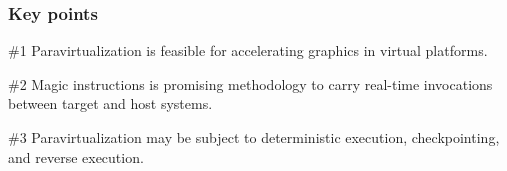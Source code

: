 
\begin{frame}
\frametitle{Key points}

\begin{block}{\#1}
	Paravirtualization is feasible for accelerating graphics in virtual platforms.
\end{block}

\begin{block}{\#2}
	Magic instructions is promising methodology to carry real-time invocations between target and host systems.
\end{block}

\begin{block}{\#3}
	Paravirtualization may be subject to deterministic execution, checkpointing, and reverse execution.
\end{block}

\end{frame}
